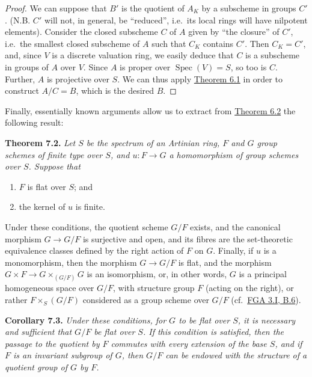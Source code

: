 \documentclass{article}
\providecommand{\tightlist}{%
  \setlength{\itemsep}{0pt}\setlength{\parskip}{0pt}}
\newenvironment{itenv}[1]
  {\phantomsection\par\smallskip\noindent\textbf{#1.}\itshape}
  {\par\smallskip}
\newcommand{\oldpage}[1]{\marginpar{\footnotesize$\Big\vert$ \textit{p.~#1}}}
\theoremstyle{definition}
\theoremstyle{definition}
\theoremstyle{definition}
\theoremstyle{definition}
\theoremstyle{remark}
\begin{document}
\begin{proof}
We can suppose that \(B'\) is the quotient of \(A_K\) by a subscheme in groups \(C'\).
(N.B. \(C'\) will not, in general, be ``reduced'', i.e.~its local rings will have nilpotent elements).
Consider the closed subscheme \(C\) of \(A\) given by ``the closure'' of \(C'\), i.e.~the smallest closed subscheme of \(A\) such that \(C_K\) contains \(C'\).
Then \(C_K=C'\), and, since \(V\) is a discrete valuation ring, we easily deduce that \(C\) is a subscheme in groups of \(A\) over \(V\).
Since \(A\) is proper over \(\operatorname{Spec}(V)=S\), so too is \(C\).
Further, \(A\) is projective over \(S\).
\oldpage{212-17}We can thus apply \protect\hyperlink{fga-3-iii-theorem-6.1}{Theorem 6.1} in order to construct \(A/C=B\), which is the desired \(B\).
\end{proof}

Finally, essentially known arguments allow us to extract from \protect\hyperlink{fga-3-iii-theorem-6.2}{Theorem 6.2} the following result:

\leavevmode{}%
\begin{itenv}{Theorem 7.2}
Let \(S\) be the spectrum of an Artinian ring, \(F\) and \(G\) group schemes of finite type over \(S\), and \(u\colon F\to G\) a homomorphism of group schemes over \(S\).
Suppose that

\begin{enumerate}
\def\labelenumi{\roman{enumi}.}
\tightlist
\item
  \(F\) is flat over \(S\); and
\item
  the kernel of \(u\) is finite.
\end{enumerate}

Under these conditions, the quotient scheme \(G/F\) exists, and the canonical morphism \(G\to G/F\) is surjective and open, and its fibres are the set-theoretic equivalence classes defined by the right action of \(F\) on \(G\).
Finally, if \(u\) is a monomorphism, then the morphism \(G\to G/F\) is flat, and the morphism \(G\times F\to G\times_{(G/F)}G\) is an isomorphism, or, in other words, \(G\) is a principal homogeneous space over \(G/F\), with structure group \(F\) (acting on the right), or rather \(F\times_S(G/F)\) considered as a group scheme over \(G/F\) (cf.~\protect\hyperlink{fga-3-i-section-B.6}{FGA 3.I, B.6}).

\end{itenv}

\leavevmode{}%
\begin{itenv}{Corollary 7.3}
Under these conditions, for \(G\) to be flat over \(S\), it is necessary and sufficient that \(G/F\) be flat over \(S\).
If this condition is satisfied, then the passage to the quotient by \(F\) commutes with every extension of the base \(S\), and if \(F\) is an invariant subgroup of \(G\), then \(G/F\) can be endowed with the structure of a \emph{quotient group} of \(G\) by \(F\).

\end{itenv}
\end{document}

